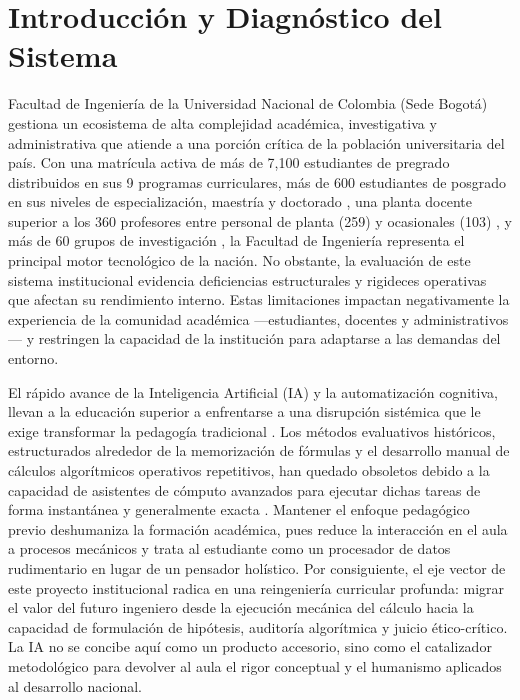 \documentclass[journal,10pt,twocolumn,letterpaper]{IEEEtran}
\begin{document}
\section{Introducción y Diagnóstico del Sistema}
 Facultad de Ingeniería de la Universidad Nacional de Colombia (Sede Bogotá) gestiona un ecosistema de alta complejidad académica, investigativa y administrativa que atiende a una porción crítica de la población universitaria del país. Con una matrícula activa de más de 7,100 estudiantes de pregrado distribuidos en sus 9 programas curriculares, más de 600 estudiantes de posgrado en sus niveles de especialización, maestría y doctorado \cite{planeacion_unal_cifras}, una planta docente superior a los 360 profesores entre personal de planta (259) y ocasionales (103) \cite{planeacion_unal_cifras}, y más de 60 grupos de investigación \cite{horus}, la Facultad de Ingeniería representa el principal motor tecnológico de la nación. No obstante, la evaluación de este sistema institucional evidencia deficiencias estructurales y rigideces operativas que afectan su rendimiento interno. Estas limitaciones impactan negativamente la experiencia de la comunidad académica —estudiantes, docentes y administrativos— y restringen la capacidad de la institución para adaptarse a las demandas del entorno.

El rápido avance de la Inteligencia Artificial (IA) y la automatización cognitiva, llevan a la educación superior a enfrentarse a una disrupción sistémica que le exige transformar la pedagogía tradicional \cite{disrupcion_ia_education, disrupcion_ia_education2}. Los métodos evaluativos históricos, estructurados alrededor de la memorización de fórmulas y el desarrollo manual de cálculos algorítmicos operativos repetitivos, han quedado obsoletos debido a la capacidad de asistentes de cómputo avanzados para ejecutar dichas tareas de forma instantánea y generalmente exacta \cite{ia_engineering_pedagogy, ia_engineering_pedagogy2}. Mantener el enfoque pedagógico previo deshumaniza la formación académica, pues reduce la interacción en el aula a procesos mecánicos y trata al estudiante como un procesador de datos rudimentario en lugar de un pensador holístico. Por consiguiente, el eje vector de este proyecto institucional radica en una reingeniería curricular profunda: migrar el valor del futuro ingeniero desde la ejecución mecánica del cálculo hacia la capacidad de formulación de hipótesis, auditoría algorítmica y juicio ético-crítico. La IA no se concibe aquí como un producto accesorio, sino como el catalizador metodológico para devolver al aula el rigor conceptual y el humanismo aplicados al desarrollo nacional.
\end{document}
